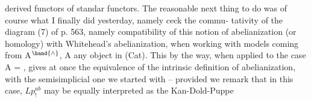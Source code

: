 derived functors of stan\-dar functors.  The reasonable next thing to do
was of course  what I finally did  yesterday,  namely ceck the commu-%
tativity of the diagram (7) of p. 563,  namely compatibility of this
notion of abelianization (or homology) with Whitehead's abelianization,
when working  with models coming from A$^{\hand{\wedge}}$,  A any object in (Cat).
This by the way,  when applied to the case  A = \hand{$\Delta$} ,  gives at once
the equivalence of the intrinsic definition of abelianization,  with
the semisimplicial one we started with  --  provided we remark that in
this case,  $Lp_!^{ab}$  may be equally interpreted as the Kan-Dold-Puppe


